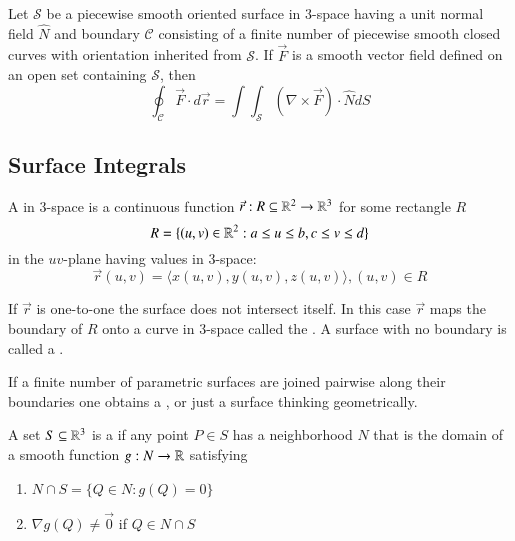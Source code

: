 \begin{appendices}
    \begin{namthm}
        Let $\mathcal{S}$ be a piecewise smooth oriented surface in $3$-space having a unit normal field $\hat{N}$ and boundary $\mathcal{C}$ consisting of a finite number of piecewise smooth closed curves with orientation inherited from $\mathcal{S}$. If $\vec{F}$ is a smooth vector field defined on an open set containing $\mathcal{S}$, then \begin{equation}
            \oint_{\mathcal{C}}\vec{F}\cdot d\vec{r} = \int\int_{\mathcal{S}}(\nabla \times \vec{F})\cdot \hat{N}dS
        \end{equation}
    \end{namthm}
    
    \subsection{Surface Integrals}
    
    \begin{defn}
        A  in $3$-space is a continuous function $\vec{r}: R \subseteq \mathbb R^2 \rightarrow \mathbb R^3$ for some rectangle $R$ \begin{equation}
            R = \{(u,v) \in \mathbb R^2: a \leq u \leq b, c \leq v \leq d\}
        \end{equation}
        in the $uv$-plane having values in $3$-space: \begin{equation}
            \vec{r}(u,v) = \langle x(u,v), y(u,v), z(u,v)\rangle, (u,v) \in R
        \end{equation}
    \end{defn}
    
    \begin{rmk}
        If $\vec{r}$ is one-to-one the surface does not intersect itself. In this case $\vec{r}$ maps the boundary of $R$ onto a curve in $3$-space called the . A surface with no boundary is called a .
    \end{rmk}
    
    \begin{defn}
        If a finite number of parametric surfaces are joined pairwise along their boundaries one obtains a , or just a surface thinking geometrically.
    \end{defn}
    
    \begin{defn}
        A set $S \subseteq\mathbb R^3$ is a  if any point $P \in S$ has a neighborhood $N$ that is the domain of a smooth function $g:N \rightarrow \mathbb R$ satisfying \begin{enumerate}
            \item $N \cap S = \{Q \in N:g(Q) = 0\}$
            \item $\nabla g(Q) \neq \vec{0}$ if $Q \in N \cap S$
        \end{enumerate}
    \end{defn}
    

\end{appendices}
